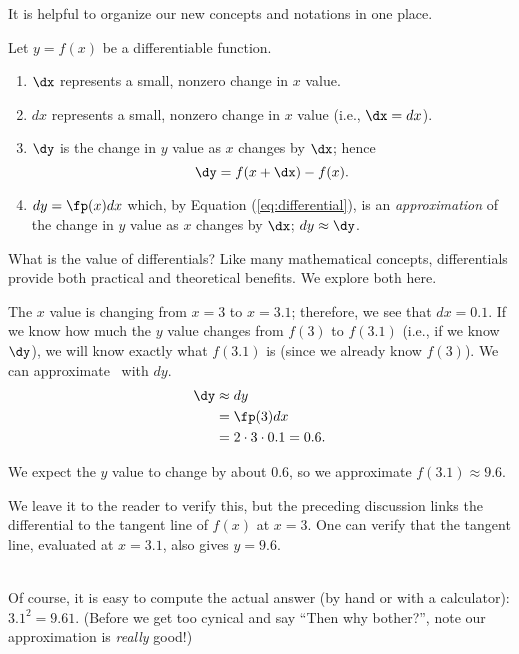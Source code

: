 It is helpful to organize our new concepts and notations in one place.

{Let $y = f(x)$ be a differentiable function. 
\begin{enumerate}
	\item $\dx$ represents a small, nonzero change in $x$ value.
	\item	$dx$ represents a small, nonzero change in $x$ value (i.e., $\dx = dx$).
	\item	$\dy$ is the change in $y$ value as $x$ changes by $\dx$; hence $$\dy = f(x+\dx)-f(x).$$
	\item		$dy = \fp(x)dx$ which, by Equation (\ref{eq:differential}), is an \textit{approximation} of the change in $y$ value as $x$ changes by $\dx$; $dy \approx \dy$.
\end{enumerate}
}

What is the value of differentials? Like many mathematical concepts, differentials provide both practical and theoretical benefits. We explore both here.\\


{The $x$ value is changing from $x=3$ to $x=3.1$; therefore, we see that $dx=0.1$. If we know how much the $y$ value changes from $f(3)$ to $f(3.1)$ (i.e., if we know $\dy$), we will know exactly what $f(3.1)$ is (since we already know $f(3)$). We can approximate \dy\ with $dy$.
\begin{align*} \dy &\approx dy \\
								  &= \fp(3)dx \\
								  &= 2\cdot 3\cdot 0.1 = 0.6.
\end{align*}

We expect the $y$ value to change by about $0.6$, so we approximate $f(3.1) \approx 9.6.$

We leave it to the reader to verify this, but the preceding discussion links the differential to the tangent line of $f(x)$ at $x=3$. One can verify that the tangent line, evaluated at $x=3.1$, also gives $y=9.6$.
}\\

Of course, it is easy to compute the actual answer (by hand or with a calculator): $3.1^2 = 9.61.$ (Before we get too cynical and say ``Then why bother?'', note our approximation is \textit{really} good!)

